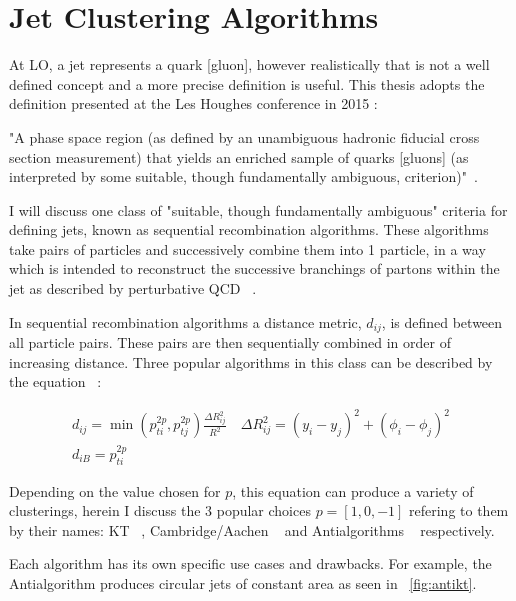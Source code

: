\section{Jet Clustering Algorithms}\label{secSM:ch1}

At LO, a jet represents a quark [gluon], however realistically that is not a well defined concept and a more precise definition is useful. This thesis adopts the definition presented at the Les Houghes conference in 2015 :\newline

"A phase space region (as defined by an unambiguous hadronic fiducial cross section measurement) that yields an enriched sample of quarks [gluons] (as interpreted by some suitable, though fundamentally ambiguous, criterion)"~\cite{Badger:2016bpw}.\newline 

I will discuss one class of "suitable, though fundamentally ambiguous" criteria for defining jets, known as sequential recombination algorithms. These algorithms take pairs of particles and successively combine them into 1 particle, in a way which is intended to reconstruct the successive branchings of partons within the jet as described by perturbative QCD ~\cite{Marzani:2019hun}.
 
In sequential recombination algorithms a distance metric, $d_{ij}$, is defined between all particle pairs. These pairs are then sequentially combined in order of increasing distance. Three popular algorithms in this class can be described by the equation ~\cite{eq:sequRec}:


\begin{equation}\label{eq:sequRec}
\begin{array}{l}{d_{i j}=\min \left(p_{t i}^{2 p}, p_{t j}^{2 p}\right) \frac{\Delta R_{i j}^{2}}{R^{2}} \quad \Delta R_{i j}^{2}=\left(y_{i}-y_{j}\right)^{2}+\left(\phi_{i}-\phi_{j}\right)^{2}} \\ {d_{i B}=p_{t i}^{2 p}}\end{array}
\end{equation}


Depending on the value chosen for $p$, this equation can produce a variety of clusterings, herein I discuss the 3 popular choices $p = [1, 0, -1]$ refering to them by their names: KT ~\cite{Ellis:1993tq}, Cambridge/Aachen ~\cite{Dokshitzer:1997in} and Anti\kt algorithms ~\cite{Cacciari:2008gp} respectively.

Each algorithm has its own specific use cases and drawbacks. For example, the Anti\kt algorithm produces circular jets of constant area as seen in ~\ref{fig:antikt}. 

